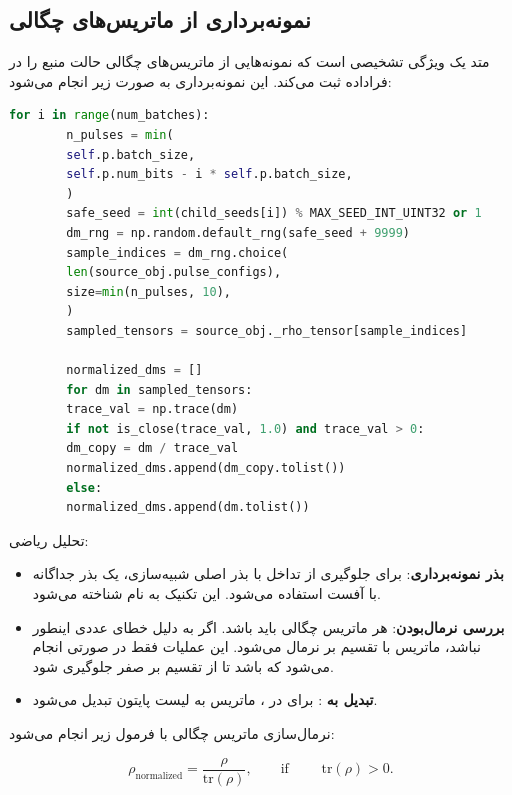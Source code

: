 \subsection{نمونه‌برداری از ماتریس‌های چگالی}

متد  یک ویژگی تشخیصی است که نمونه‌هایی از ماتریس‌های چگالی حالت منبع را در فراداده ثبت می‌کند. این نمونه‌برداری به صورت زیر انجام می‌شود:

\begin{LTR}
	\begin{lstlisting}[language=Python]
		for i in range(num_batches):
		n_pulses = min(
		self.p.batch_size,
		self.p.num_bits - i * self.p.batch_size,
		)
		safe_seed = int(child_seeds[i]) % MAX_SEED_INT_UINT32 or 1
		dm_rng = np.random.default_rng(safe_seed + 9999)
		sample_indices = dm_rng.choice(
		len(source_obj.pulse_configs),
		size=min(n_pulses, 10),
		)
		sampled_tensors = source_obj._rho_tensor[sample_indices]
		
		normalized_dms = []
		for dm in sampled_tensors:
		trace_val = np.trace(dm)
		if not is_close(trace_val, 1.0) and trace_val > 0:
		dm_copy = dm / trace_val
		normalized_dms.append(dm_copy.tolist())
		else:
		normalized_dms.append(dm.tolist())
	\end{lstlisting}
\end{LTR}

\noindent تحلیل ریاضی:

\begin{itemize}
	\item \textbf{بذر نمونه‌برداری}: برای جلوگیری از تداخل با بذر اصلی شبیه‌سازی، یک بذر جداگانه با آفست  استفاده می‌شود. این تکنیک به نام  شناخته می‌شود.
	\item \textbf{بررسی نرمال‌بودن}: هر ماتریس چگالی باید  باشد. اگر به دلیل خطای عددی اینطور نباشد، ماتریس با تقسیم بر  نرمال می‌شود. این عملیات فقط در صورتی انجام می‌شود که  باشد تا از تقسیم بر صفر جلوگیری شود.
	\item \textbf{تبدیل به }: برای  در ، ماتریس  به لیست پایتون تبدیل می‌شود.
\end{itemize}

نرمال‌سازی ماتریس چگالی با فرمول زیر انجام می‌شود:

\begin{equation}
	\rho_{\text{normalized}} = \frac{\rho}{\text{tr}(\rho)}, \qquad \text{if } \qquad \text{tr}(\rho) > 0.
\end{equation}

